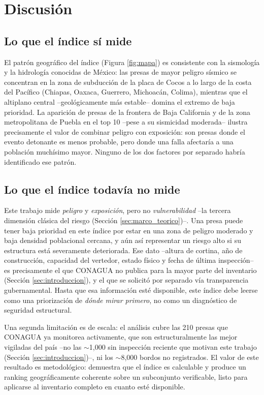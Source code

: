 \section{Discusi\'on}
\label{sec:discusion}

\subsection{Lo que el \'indice s\'i mide}

El patr\'on geogr\'afico del \'indice (Figura \ref{fig:mapa}) es consistente con la sismolog\'ia y la hidrolog\'ia conocidas de M\'exico: las presas de mayor peligro s\'ismico se concentran en la zona de subducci\'on de la placa de Cocos a lo largo de la costa del Pac\'ifico (Chiapas, Oaxaca, Guerrero, Michoac\'an, Colima), mientras que el altiplano central --geol\'ogicamente m\'as estable-- domina el extremo de baja prioridad. La aparici\'on de presas de la frontera de Baja California y de la zona metropolitana de Puebla en el top 10 --pese a su sismicidad moderada-- ilustra precisamente el valor de combinar peligro con exposici\'on: son presas donde el evento detonante es menos probable, pero donde una falla afectar\'ia a una poblaci\'on much\'isimo mayor. Ninguno de los dos factores por separado habr\'ia identificado ese patr\'on.

\subsection{Lo que el \'indice todav\'ia no mide}

Este trabajo mide \emph{peligro} y \emph{exposici\'on}, pero no \emph{vulnerabilidad} --la tercera dimensi\'on cl\'asica del riesgo (Secci\'on \ref{sec:marco_teorico})--. Una presa puede tener baja prioridad en este \'indice por estar en una zona de peligro moderado y baja densidad poblacional cercana, y a\'un as\'i representar un riesgo alto si su estructura est\'a severamente deteriorada. Ese dato --altura de cortina, a\~no de construcci\'on, capacidad del vertedor, estado f\'isico y fecha de \'ultima inspecci\'on-- es precisamente el que CONAGUA no publica para la mayor parte del inventario (Secci\'on \ref{sec:introduccion}), y el que se solicit\'o por separado v\'ia transparencia gubernamental. Hasta que esa informaci\'on est\'e disponible, este \'indice debe leerse como una priorizaci\'on de \emph{d\'onde mirar primero}, no como un diagn\'ostico de seguridad estructural.

Una segunda limitaci\'on es de escala: el an\'alisis cubre las 210 presas que CONAGUA ya monitorea activamente, que son estructuralmente las mejor vigiladas del pa\'is --no las \(\sim\)1{,}000 sin inspecci\'on reciente que motivan este trabajo (Secci\'on \ref{sec:introduccion})--, ni los \(\sim\)8{,}000 bordos no registrados. El valor de este resultado es metodol\'ogico: demuestra que el \'indice es calculable y produce un ranking geogr\'aficamente coherente sobre un subconjunto verificable, listo para aplicarse al inventario completo en cuanto est\'e disponible.


